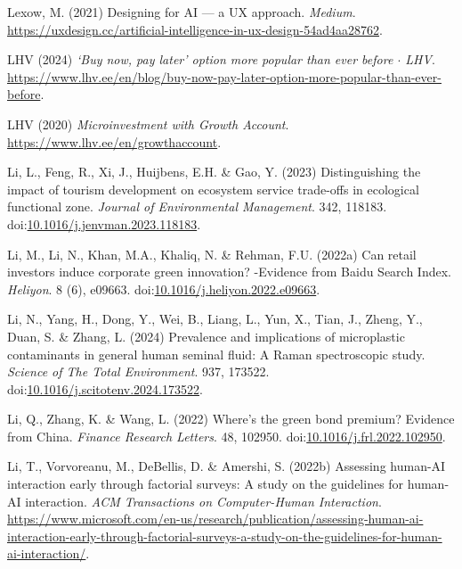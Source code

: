 \documentclass[
  letterpaper,
  DIV=11,
  numbers=noendperiod]{scrartcl}
\newlength{\cslhangindent}
\newenvironment{CSLReferences}[2] %
 {\begin{list}{}{%
  \setlength{\itemindent}{0pt}
  \setlength{\leftmargin}{0pt}
  \setlength{\parsep}{0pt}
  \ifodd #1
   \setlength{\leftmargin}{\cslhangindent}
   \setlength{\itemindent}{-1\cslhangindent}
  \fi
  \setlength{\itemsep}{#2\baselineskip}}}
 {\end{list}}
\begin{document}
\begin{CSLReferences}{0}{1}
Lexow, M. (2021) Designing for {AI} --- a {UX} approach. \emph{Medium}.
\url{https://uxdesign.cc/artificial-intelligence-in-ux-design-54ad4aa28762}.

LHV (2024) \emph{{`{Buy} now, pay later'} option more popular than ever
before {\(\cdot\)} {LHV}}.
\url{https://www.lhv.ee/en/blog/buy-now-pay-later-option-more-popular-than-ever-before}.

LHV (2020) \emph{Microinvestment with {Growth Account}}.
\url{https://www.lhv.ee/en/growthaccount}.

Li, L., Feng, R., Xi, J., Huijbens, E.H. \& Gao, Y. (2023)
Distinguishing the impact of tourism development on ecosystem service
trade-offs in ecological functional zone. \emph{Journal of Environmental
Management}. 342, 118183.
doi:\href{https://doi.org/10.1016/j.jenvman.2023.118183}{10.1016/j.jenvman.2023.118183}.

Li, M., Li, N., Khan, M.A., Khaliq, N. \& Rehman, F.U. (2022a) Can
retail investors induce corporate green innovation? -{Evidence} from
{Baidu Search Index}. \emph{Heliyon}. 8 (6), e09663.
doi:\href{https://doi.org/10.1016/j.heliyon.2022.e09663}{10.1016/j.heliyon.2022.e09663}.

Li, N., Yang, H., Dong, Y., Wei, B., Liang, L., Yun, X., Tian, J.,
Zheng, Y., Duan, S. \& Zhang, L. (2024) Prevalence and implications of
microplastic contaminants in general human seminal fluid: {A Raman}
spectroscopic study. \emph{Science of The Total Environment}. 937,
173522.
doi:\href{https://doi.org/10.1016/j.scitotenv.2024.173522}{10.1016/j.scitotenv.2024.173522}.

Li, Q., Zhang, K. \& Wang, L. (2022) Where's the green bond premium?
{Evidence} from {China}. \emph{Finance Research Letters}. 48, 102950.
doi:\href{https://doi.org/10.1016/j.frl.2022.102950}{10.1016/j.frl.2022.102950}.

Li, T., Vorvoreanu, M., DeBellis, D. \& Amershi, S. (2022b) Assessing
human-{AI} interaction early through factorial surveys: {A} study on the
guidelines for human-{AI} interaction. \emph{ACM Transactions on
Computer-Human Interaction}.
\url{https://www.microsoft.com/en-us/research/publication/assessing-human-ai-interaction-early-through-factorial-surveys-a-study-on-the-guidelines-for-human-ai-interaction/}.


\end{CSLReferences}
\end{document}
